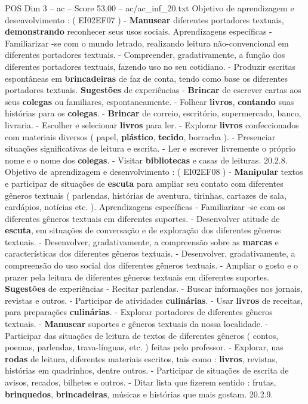 \begin{textsample}{POS Dim 3 – ac – Score 53.00 – ac/ac\_inf\_20.txt}
Objetivo de aprendizagem e desenvolvimento : ( EI02EF07 ) - \textbf{Manusear} diferentes portadores textuais, \textbf{demonstrando} reconhecer seus usos sociais.
Aprendizagens específicas - Familiarizar -se com o mundo letrado, realizando leitura não-convencional em diferentes portadores textuais. - Compreender, gradativamente, a função dos diferentes portadores textuais, fazendo uso no seu cotidiano. - Produzir escritas espontâneas em \textbf{brincadeiras} de faz de conta, tendo como base os diferentes portadores textuais. \textbf{Sugestões} de experiências - \textbf{Brincar} de escrever cartas aos seus \textbf{colegas} ou familiares, espontaneamente. - Folhear \textbf{livros}, \textbf{contando} suas histórias para os \textbf{colegas}. - \textbf{Brincar} de correio, escritório, supermercado, banco, livraria. - Escolher e selecionar \textbf{livros} para ler. - Explorar \textbf{livros} confeccionados com materiais diversos ( papel, \textbf{plástico}, \textbf{tecido}, borracha ). - Presenciar situações significativas de leitura e escrita. - Ler e escrever livremente o próprio nome e o nome dos \textbf{colegas}. - Visitar \textbf{bibliotecas} e casas de leituras. 20.2.8.
Objetivo de aprendizagem e desenvolvimento : ( EI02EF08 ) - \textbf{Manipular} textos e participar de situações de \textbf{escuta} para ampliar seu contato com diferentes gêneros textuais ( parlendas, histórias de aventura, tirinhas, cartazes de sala, cardápios, notícias etc. ).
Aprendizagens específicas - Familiarizar -se com os diferentes gêneros textuais em diferentes suportes. - Desenvolver atitude de \textbf{escuta}, em situações de conversação e de exploração dos diferentes gêneros textuais. - Desenvolver, gradativamente, a compreensão sobre as \textbf{marcas} e características dos diferentes gêneros textuais. - Desenvolver, gradativamente, a compreensão do uso social dos diferentes gêneros textuais. - Ampliar o gosto e o prazer pela leitura de diferentes gêneros textuais em diferentes suportes. \textbf{Sugestões} de experiências - Recitar parlendas. - Buscar informações nos jornais, revistas e outros. - Participar de atividades \textbf{culinárias}. - Usar \textbf{livros} de receitas, para preparações \textbf{culinárias}. - Explorar portadores de diferentes gêneros textuais. - \textbf{Manusear} suportes e gêneros textuais da nossa localidade. - Participar das situações de leitura de textos de diferentes gêneros ( contos, poemas, parlendas, trava-línguas, etc. ) feitas pelo professor. - Explorar, nas \textbf{rodas} de leitura, diferentes materiais escritos, tais como : \textbf{livros}, revistas, histórias em quadrinhos, dentre outros. - Participar de situações de escrita de avisos, recados, bilhetes e outros. - Ditar lista que fizerem sentido : frutas, \textbf{brinquedos}, \textbf{brincadeiras}, músicas e histórias que mais gostam. 20.2.9.

\end{textsample}
